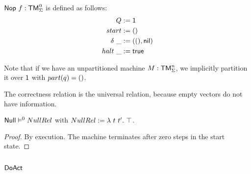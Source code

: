 \begin{definition}[Null][Null]
  \label{def:Null}
  $\MS{Nop}~f: \TM_\Sigma^{\mkern+1mu 0}$ is defined as follows:
  \begin{align*}
    Q          &:= \mathsf{1} \\
    start      &:= \mathsf{()} \\
    \delta ~\_ &:= (\mathsf{()}, \mathsf{nil}) \\
    halt   ~\_ &:= \mathsf{true}
  \end{align*}
\end{definition}
Note that if we have an unpartitioned machine $M:\mathsf{TM}_\Sigma^n$, we implicitly partition it over $\mathsf{1}$ with $part(q)=\mathsf{()}$.

The correctness relation is the universal relation, because empty vectors do not have information.
\begin{lemma}
  \label{lem:Null_Sem} $\mathsf{Null} \mathrel{\vDash^{0}} NullRel$ with $NullRel := \lambda~t~t'.~ \top$.
\end{lemma}
\begin{proof}
  By execution.  The machine terminates after zero steps in the start state.
\end{proof}

\subsection{$\mathsf{DoAct}$}
\label{sec:DoAct}



